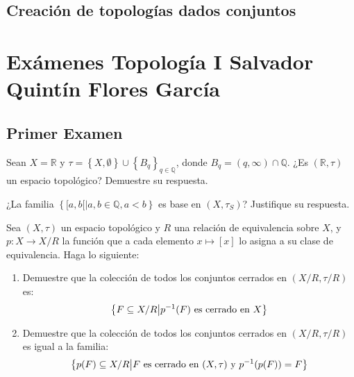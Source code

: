 \documentclass[12pt]{report}
\theoremstyle{largebreak}
\newcommand\cf[3]{\ensuremath{#1:#2\rightarrow#3}}
\begin{document}
    \setcounter{section}{2}

    \section{Creación de topologías dados conjuntos}

    \begin{excer}
        
    \end{excer}


    \appendix

    \chapter{Exámenes Topología I Salvador Quintín Flores García}

    \section{Primer Examen}

    \begin{excer}
        Sean $X=\mathbb{R}$ y $\tau=\left\{X,\emptyset \right\}\cup\left\{B_q\right\}_{q\in\mathbb{Q}}$, donde $B_q=(q,\infty)\cap\mathbb{Q}$. ¿Es $(\mathbb{R},\tau)$ un espacio topológico? Demuestre su respuesta.
    \end{excer}

    \begin{sol}
        
    \end{sol}

    \begin{excer}
        ¿La familia $\left\{[a,b[\big| a,b\in\mathbb{Q}, a<b \right\}$ es base en $(X,\tau_S)$? Justifique su respuesta.
    \end{excer}

    \begin{sol}
        
    \end{sol}

    \begin{excer}
        Sea $(X,\tau)$ un espacio topológico y $R$ una relación de equivalencia sobre $X$, y $\cf{p}{X}{X/R}$ la función que a cada elemento $x\mapsto [x]$ lo asigna a su clase de equivalencia. Haga lo siguiente:
        \begin{enumerate}
            \item Demuestre que la colección de todos los conjuntos cerrados en $(X/R,\tau/R)$ es:
            \begin{equation*}
                \left\{F\subseteq X/R\big| p^{-1}(F) \textup{ es cerrado en }X \right\}
            \end{equation*}
            \item Demuestre que la colección de todos los conjuntos cerrados en $(X/R, \tau/R)$ es igual a la familia:
            \begin{equation*}
                \left\{p(F)\subseteq X/R\big| F\textup{ es cerrado en }(X,\tau)\textup{ y }p^{-1}(p(F))=F \right\}
            \end{equation*}
        \end{enumerate}
    \end{excer}
\end{document}
